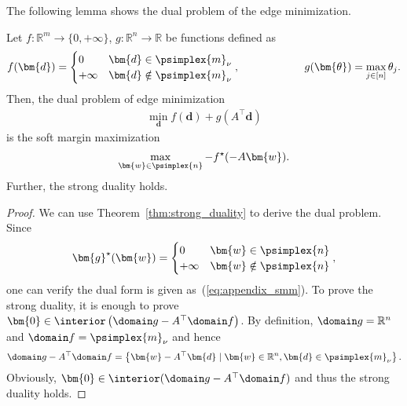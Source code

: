 The following lemma shows the dual problem of the edge minimization. 
\begin{lem.}
    \label{lem:dual_problem}
    Let $f : \mathbb R^m \to \{0, +\infty\}$, 
    $g : \mathbb R^n \to \mathbb R$ be 
    functions defined as 
    \begin{align}
        \nonumber
        f(\bm{d}) =
        \begin{cases}
                  0 & \bm{d} \in    \psimplex{m}_{\nu} \\
            +\infty & \bm{d} \notin \psimplex{m}_{\nu}
        \end{cases},
        \qquad \qquad \qquad
        g(\bm{\theta}) = \max_{j \in [n]} \theta_j.
    \end{align}
    Then, the dual problem of edge minimization 
    \begin{align}
        \label{eq:appendix_edge_minimization}
        \min_{\bm{d}} f(\bm{d}) + g(A^\top \bm{d})
    \end{align}
    is the soft margin maximization 
    \begin{align}
        \label{eq:appendix_smm}
        \max_{\bm{w} \in \psimplex{n}} - f^\star( -A \bm{w} ).
    \end{align}
    Further, the strong duality holds. 
\end{lem.}
\begin{proof}
    We can use Theorem~\ref{thm:strong_duality} to derive the dual problem. 
    Since 
    \begin{align*}
        \bm{g}^\star(\bm{w}) = 
        \begin{cases}
                  0 & \bm{w} \in    \psimplex{n} \\
            +\infty & \bm{w} \notin \psimplex{n}
        \end{cases},
    \end{align*}
    one can verify the dual form is given as~(\ref{eq:appendix_smm}). 
    To prove the strong duality, 
    it is enough to prove 
    $
        \bm{0} \in \interior\left(
            \domain g - A^\top \domain f
        \right)
    $. 
    By definition, $\domain g = \mathbb R^n$ and 
    $\domain f = \psimplex{m}_{\nu}$ and hence 
    \begin{align*}
        \domain g - A^\top \domain f
        = \left\{
            \bm{w} - A^\top \bm{d} \mid
            \bm{w} \in \mathbb{R}^n, \bm{d} \in \psimplex{m}_{\nu}
        \right\}.
    \end{align*}
    Obviously, $\bm{0} \in \interior (\domain g - A^\top \domain f)$ 
    and thus the strong duality holds. 
\end{proof}
